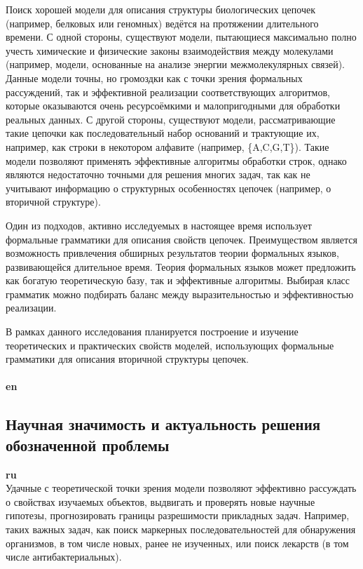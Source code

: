 \documentclass[12pt]{article}  %
\theoremstyle{remark}
\begin{document}
Поиск хорошей модели для описания структуры биологических цепочек (например, белковых или геномных) ведётся на протяжении длительного времени.
С одной стороны, существуют модели, пытающиеся максимально полно учесть химические и физические законы взаимодействия между молекулами (например, модели, основанные на анализе энергии межмолекулярных связей).
Данные модели точны, но громоздки как с точки зрения формальных рассуждений, так и эффективной реализации соответствующих алгоритмов, которые оказываются очень ресурсоёмкими и малопригодными для обработки реальных данных.
С другой стороны, существуют модели, рассматривающие такие цепочки как последовательный набор оснований и трактующие их, например, как строки в некотором алфавите (например, \{A,C,G,T\}).
Такие модели позволяют применять эффективные алгоритмы обработки строк, однако являются недостаточно точными для решения многих задач, так как не учитывают информацию о структурных особенностях цепочек (например, о вторичной структуре).

Один из подходов, активно исследуемых в настоящее время использует формальные грамматики для описания свойств цепочек.
Преимуществом является возможность привлечения обширных результатов теории формальных языков, развивающейся длительное время.
Теория формальных языков может предложить как богатую теоретическую базу, так и эффективные алгоритмы.
Выбирая класс грамматик можно подбирать баланс между выразительностью и эффективностью реализации.

В рамках данного исследования планируется построение и изучение теоретических и практических свойств моделей, использующих формальные грамматики для описания вторичной структуры цепочек.
\\
\\
\textbf{en}\\



\subsection{Научная значимость и актуальность решения обозначенной проблемы}

\textbf{ru}\\
Удачные с теоретической точки зрения модели позволяют эффективно рассуждать о свойствах изучаемых объектов, выдвигать и проверять новые научные гипотезы, прогнозировать границы разрешимости прикладных задач. Например, таких важных задач, как поиск маркерных последовательностей для обнаружения организмов, в том числе новых, ранее не изученных, или поиск лекарств (в том числе антибактериальных).
\end{document}
